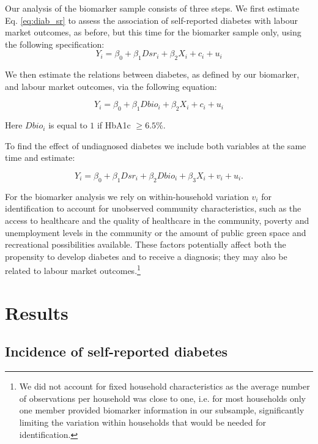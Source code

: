Our analysis of the biomarker sample consists of three steps. We first estimate Eq. \ref{eq:diab_sr} to assess the association of self-reported diabetes with labour market outcomes, as before, but this time for the biomarker sample only, using the following specification:
\begin{equation}
Y_{i}=\beta_{0}+\beta_{1}Dsr_{i}+\beta_{2}X_{i}+c_{i}+u_{i}\label{eq:diab_sr}
\end{equation}

We then estimate the relations between diabetes, as defined by our biomarker, and labour market outcomes, via the following equation:

\begin{equation}
Y_{i}=\beta_{0}+\beta_{1}Dbio_{i}+\beta_{2}X_{i}+c_{i}+u_{i}\label{eq:diab}
\end{equation}

Here $Dbio_{i}$ is equal to $1$ if \ac{HbA1c} $\geq6.5\%$. 

To find the effect of undiagnosed diabetes we include both variables at the same time and estimate:

\begin{equation}
Y_{i}=\beta_{0}+\beta_{1}Dsr_{i}+\beta_{2}Dbio_{i}+\beta_{3}X_{i}+v_{i}+u_{i}.\label{eq:diab_ud}
\end{equation}

For the biomarker analysis we rely on within-household variation $v_{i}$ for identification to account for unobserved community characteristics, such as the access to healthcare and the quality of healthcare in the community, poverty and unemployment levels in the community or the amount of public green space and recreational possibilities available. These factors potentially affect both the propensity to develop diabetes and to receive a diagnosis; they may also be related to labour market outcomes.\footnote{We did not account for fixed household characteristics as the average number of observations per household was close to one, i.e. for most households only one member provided biomarker information in our subsample, significantly limiting the variation within households that would be needed for identification.}

\section{\label{sec:cha_4_results}Results}


\subsection{Incidence of self-reported diabetes}

